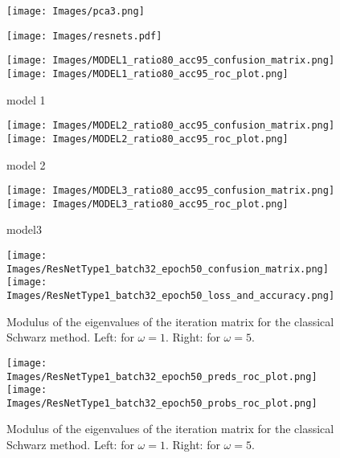 \documentclass[a4paper,12pt]{article}
\begin{document}
\begin{figure}[H]
  \centering
  \texttt{[image: Images/pca3.png]}
\end{figure}

\begin{figure}[H]
  \centering
  \texttt{[image: Images/resnets.pdf]}
\end{figure}


\begin{figure}[H]
  \centering
  \texttt{[image: Images/MODEL1\_ratio80\_acc95\_confusion\_matrix.png]} \qquad
  \texttt{[image: Images/MODEL1\_ratio80\_acc95\_roc\_plot.png]}
  \caption{model 1}
  \label{Fig1}
\end{figure}

\begin{figure}[H]
  \centering
  \texttt{[image: Images/MODEL2\_ratio80\_acc95\_confusion\_matrix.png]} \qquad
  \texttt{[image: Images/MODEL2\_ratio80\_acc95\_roc\_plot.png]}
  \caption{model 2}
  \label{Fig2}
\end{figure}


\begin{figure}[H]
  \centering
  \texttt{[image: Images/MODEL3\_ratio80\_acc95\_confusion\_matrix.png]} \qquad
  \texttt{[image: Images/MODEL3\_ratio80\_acc95\_roc\_plot.png]}
  \caption{model3}
  \label{Fig3}
\end{figure}


\begin{figure}[H]
  \centering
  \texttt{[image: Images/ResNetType1\_batch32\_epoch50\_confusion\_matrix.png]} \qquad
  \texttt{[image: Images/ResNetType1\_batch32\_epoch50\_loss\_and\_accuracy.png]}
  \caption{Modulus of the eigenvalues of the iteration matrix for the 
  classical Schwarz method. Left: for $\omega=1$. Right: for $\omega=5$.}
\end{figure}


\begin{figure}[H]
  \centering
  \texttt{[image: Images/ResNetType1\_batch32\_epoch50\_preds\_roc\_plot.png]} \qquad
  \texttt{[image: Images/ResNetType1\_batch32\_epoch50\_probs\_roc\_plot.png]}
  \caption{Modulus of the eigenvalues of the iteration matrix for the 
  classical Schwarz method. Left: for $\omega=1$. Right: for $\omega=5$.}
\end{figure}
\end{document}
